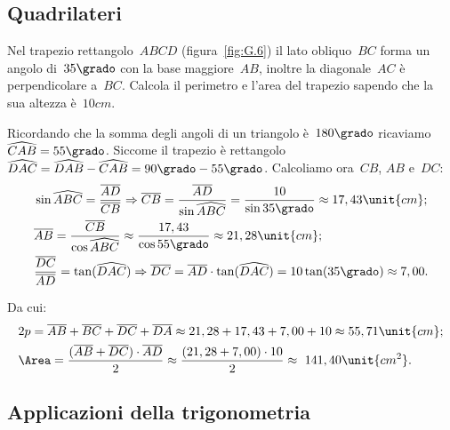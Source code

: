 
\subsection{Quadrilateri}
\label{subsec:trigo_quadrilateri}

 \begin{esempio}
Nel trapezio rettangolo~$ABCD$ (figura~\ref{fig:G.6}) il lato obliquo~$BC$ 
forma 
un angolo di~$35\grado$ con la base maggiore~$AB$, inoltre la diagonale~$AC$
è perpendicolare a~$BC$. Calcola il perimetro e l'area del trapezio sapendo 
che 
la sua altezza è~$10\unit{cm}$.

Ricordando che la somma degli angoli di un triangolo è~$180\grado$ 
ricaviamo~$\widehat{CAB}=55\grado$.
Siccome il trapezio è rettangolo
$\widehat{DAC}=\widehat{DAB}-\widehat{CAB}=90\grado-55\grado$.
Calcoliamo ora~$CB$, $AB$ e~$DC$:
\begin{align*}
&\sin \widehat{ABC} =\frac{\overline{AD}}{\overline{CB}} \Rightarrow 
\overline{CB}=\frac{\overline{AD}}{\sin \widehat{ABC}}=\frac{10}{\sin 35\grado
}\approx17,43\unit{cm};\\
&\overline{AB}=\frac{\overline{CB}}{\cos \widehat{ABC}}\approx\frac{17,43}{
\cos 55\grado}\approx21,28\unit{cm};\\
&\frac{\overline{DC}}{\overline{AD}}=\tan(\widehat{DAC}) \Rightarrow 
\overline{DC}=\overline{AD}\cdot\tan(\widehat{DAC})=10\tan(35\grado) \approx
7,00.
\end{align*}

Da cui:
\begin{align*}
&2p=\overline{AB}+\overline{BC}+\overline{DC}+\overline{DA} \approx
21,28+17,43+7,00+10\approx55,71\unit{cm};\\
&\Area=\frac{(\overline{AB}+\overline{DC})\cdot\overline{AD}}{2} \approx
\frac{(21,28+7,00)\cdot 10}{2}\approx~141,40\unit{cm^2}.
\end{align*}
 \end{esempio}


\subsection{Applicazioni della trigonometria}
\label{subsec:trigo_applicazioni}

